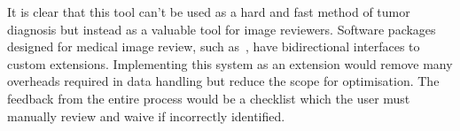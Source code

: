 \documentclass[journal]{IEEEtran}
\begin{document}
It is clear that this tool can't be used as a hard and fast method of tumor diagnosis but instead as a valuable tool for image reviewers.
Software packages designed for medical image review, such as~\cite{slicer}, have bidirectional interfaces to custom extensions.
Implementing this system as an extension would remove many overheads required in data handling but reduce the scope for optimisation.
The feedback from the entire process would be a checklist which the user must manually review and waive if incorrectly identified. 












\end{document}
